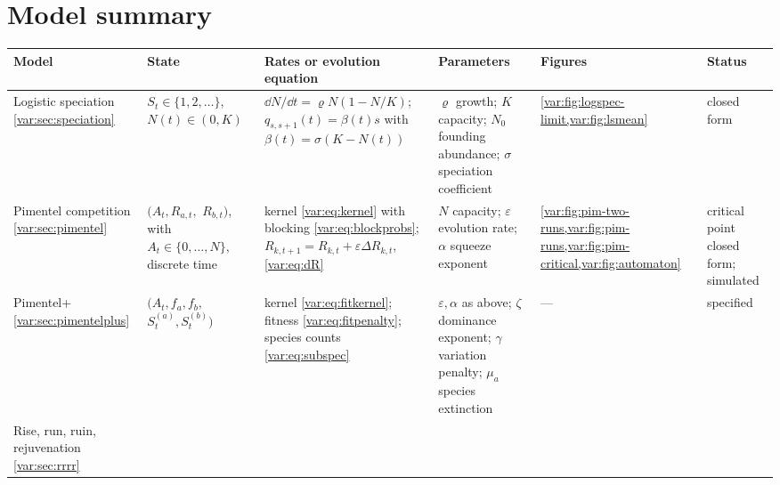 \renewcommand{\thesection}{\thechapter.\Alph{section}}
\setcounter{section}{0}


\section{Model summary}
\label{var:app:models}

\begin{table}[!tbp]
\centering
\scriptsize
\renewcommand{\arraystretch}{1.15}
\setlength{\tabcolsep}{3pt}
\begin{tabular}{@{}>{\raggedright\arraybackslash}p{}>{\raggedright\arraybackslash}p{}>{\raggedright\arraybackslash}p{}>{\raggedright\arraybackslash}p{}>{\raggedright\arraybackslash}p{}>{\raggedright\arraybackslash}p{}@{}}
\toprule
Model & State & Rates or evolution equation & Parameters
  & Figures & Status \\
\midrule
Logistic speciation \newline \cref{var:sec:speciation}
 & $S_t\in\{1,2,\dots\}$, $N(t)\in(0,K)$
 & $\dd N/\dd t=\varrho N(1-N/K)$;
   $q_{s,s+1}(t)=\beta(t)s$ with $\beta(t)=\sigma(K-N(t))$
 & $\varrho$ growth; $K$ capacity; $N_0$ founding abundance;
   $\sigma$ speciation coefficient
 & \cref{var:fig:logspec-limit,var:fig:lsmean}
 & closed form \\
Pimentel competition \newline \cref{var:sec:pimentel}
 & $(A_t,R_{a,t},$ $R_{b,t})$, with $A_t\in\{0,\dots,N\}$, discrete time
 & kernel \cref{var:eq:kernel} with blocking \cref{var:eq:blockprobs};
   $R_{k,t+1}=R_{k,t}+\varepsilon\Delta R_{k,t}$, \cref{var:eq:dR}
 & $N$ capacity; $\varepsilon$ evolution rate; $\alpha$ squeeze exponent
 & \cref{var:fig:pim-two-runs,var:fig:pim-runs,var:fig:pim-critical,var:fig:automaton}
 & critical point closed form; simulated \\
Pimentel+ \newline \cref{var:sec:pimentelplus}
 & $(A_t,f_a,f_b,$ $S^{(a)}_t,S^{(b)}_t)$
 & kernel \cref{var:eq:fitkernel}; fitness \cref{var:eq:fitpenalty};
   species counts \cref{var:eq:subspec}
 & $\varepsilon,\alpha$ as above; $\zeta$ dominance exponent;
   $\gamma$ variation penalty; $\mu_a$ species extinction
 & ---
 & specified \\
Rise, run, ruin, rejuvenation \newline \cref{var:sec:rrrr}

\end{tabular}
\end{table}
